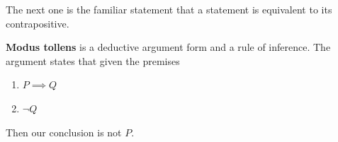   The next one is the familiar statement that a statement is equivalent to its contrapositive. 

  \begin{definition}
    \label{def:modus-tollens}
    \textbf{Modus tollens} is a deductive argument form and a rule of inference. The argument states that given the premises 
    \begin{enumerate}
      \item $P \implies Q$ 
      \item $\neg Q$ 
    \end{enumerate}
    Then our conclusion is not $P$. 
  \end{definition}

